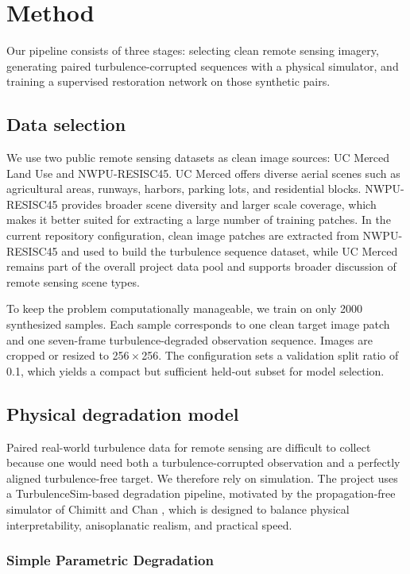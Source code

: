 \documentclass{article}
\begin{document}
\section{Method}
Our pipeline consists of three stages: selecting clean remote sensing imagery, generating paired turbulence-corrupted sequences with a physical simulator, and training a supervised restoration network on those synthetic pairs.

\subsection{Data selection}
We use two public remote sensing datasets as clean image sources: UC Merced Land Use and NWPU-RESISC45. UC Merced offers diverse aerial scenes such as agricultural areas, runways, harbors, parking lots, and residential blocks. NWPU-RESISC45 provides broader scene diversity and larger scale coverage, which makes it better suited for extracting a large number of training patches. In the current repository configuration, clean image patches are extracted from NWPU-RESISC45 and used to build the turbulence sequence dataset, while UC Merced remains part of the overall project data pool and supports broader discussion of remote sensing scene types.

To keep the problem computationally manageable, we train on only 2000 synthesized samples. Each sample corresponds to one clean target image patch and one seven-frame turbulence-degraded observation sequence. Images are cropped or resized to 256\,$\times$\,256. The configuration sets a validation split ratio of 0.1, which yields a compact but sufficient held-out subset for model selection.

\subsection{Physical degradation model}
Paired real-world turbulence data for remote sensing are difficult to collect because one would need both a turbulence-corrupted observation and a perfectly aligned turbulence-free target. We therefore rely on simulation. The project uses a TurbulenceSim-based degradation pipeline, motivated by the propagation-free simulator of Chimitt and Chan \citep{chimitt2020turbsim}, which is designed to balance physical interpretability, anisoplanatic realism, and practical speed.

\subsubsection{Simple Parametric Degradation}
\end{document}
